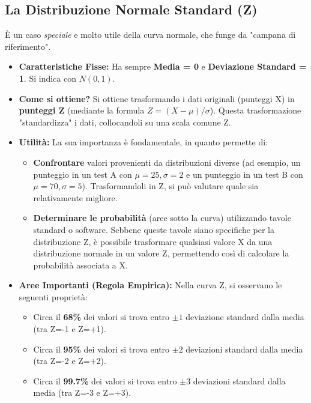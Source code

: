 \documentclass[12pt, a4paper]{article}
\begin{document}
\subsection*{La Distribuzione Normale Standard (Z)}
È un caso \textit{speciale} e molto utile della curva normale, che funge da "campana di riferimento".
\begin{itemize}
    \item \textbf{Caratteristiche Fisse:} Ha sempre \textbf{Media = 0} e \textbf{Deviazione Standard = 1}. Si indica con $N(0, 1)$.
    \item \textbf{Come si ottiene?} Si ottiene trasformando i dati originali (punteggi X) in \textbf{punteggi Z} (mediante la formula $Z = (X - \mu) / \sigma$). Questa trasformazione "standardizza" i dati, collocandoli su una scala comune Z.
    \item \textbf{Utilità:} La sua importanza è fondamentale, in quanto permette di:
        \begin{itemize}
            \item \textbf{Confrontare} valori provenienti da distribuzioni diverse (ad esempio, un punteggio in un test A con $\mu=25, \sigma=2$ e un punteggio in un test B con $\mu=70, \sigma=5$). Trasformandoli in Z, si può valutare quale sia relativamente migliore.
            \item \textbf{Determinare le probabilità} (aree sotto la curva) utilizzando tavole standard o software. Sebbene queste tavole siano specifiche per la distribuzione Z, è possibile trasformare qualsiasi valore X da una distribuzione normale in un valore Z, permettendo così di calcolare la probabilità associata a X.
        \end{itemize}
    \item \textbf{Aree Importanti (Regola Empirica):} Nella curva Z, si osservano le seguenti proprietà:
        \begin{itemize}
            \item Circa il \textbf{68\%} dei valori si trova entro $\pm 1$ deviazione standard dalla media (tra Z=-1 e Z=+1).
            \item Circa il \textbf{95\%} dei valori si trova entro $\pm 2$ deviazioni standard dalla media (tra Z=-2 e Z=+2).
            \item Circa il \textbf{99.7\%} dei valori si trova entro $\pm 3$ deviazioni standard dalla media (tra Z=-3 e Z=+3).
        \end{itemize}
\end{itemize}
\end{document}
